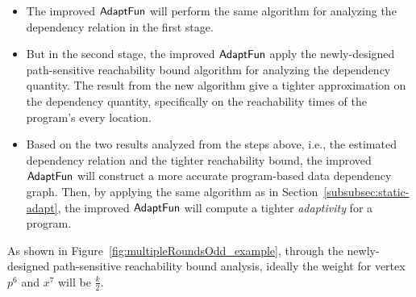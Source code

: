 \begin{enumerate}
\begin{itemize}
    \item The improved $\textsf{AdaptFun}$ will perform the same algorithm for analyzing the dependency relation in the first stage.
    \item But in the second stage, the improved $\textsf{AdaptFun}$ 
    apply the newly-designed  path-sensitive reachability bound algorithm for analyzing the dependency quantity.
    The result from the new algorithm 
    give a tighter approximation on the dependency quantity,
    specifically on the reachability times of the program's every location.
    \item Based on the two results analyzed from the steps above, 
    i.e., the estimated dependency relation and the tighter reachability bound, the improved $\textsf{AdaptFun}$ will construct
a more accurate program-based data dependency graph.
Then, by applying the same algorithm as in Section~\ref{subsubsec:static-adapt}, 
the improved $\textsf{AdaptFun}$ will compute a tighter \emph{adaptivity} for a program.%
\end{itemize}
\end{enumerate}
As shown in Figure~\ref{fig:multipleRoundsOdd_example}, 
through the newly-designed path-sensitive reachability bound analysis,
ideally the weight for vertex $p^6$ and $x^7$ will be $\frac{k}{2}$.
